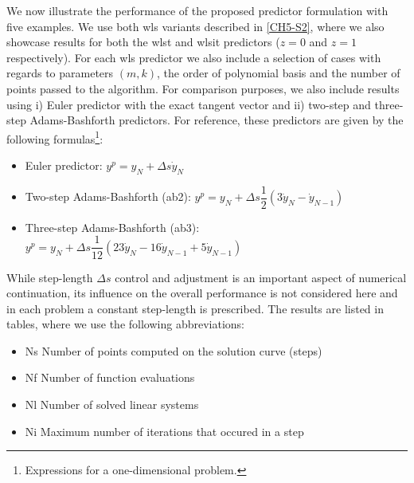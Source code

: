 We now illustrate the performance of the proposed predictor formulation with
five examples. We use both \acrshort{wls} variants described in \ref{CH5-S2}, 
where we also showcase results for both the \acrshort{wlst} and 
\acrshort{wlsit} predictors ($z=0$ and $z=1$ respectively). For each 
\acrshort{wls}
predictor we also include
a selection of cases with regards to parameters $(m,k)$, the order of 
polynomial basis and the number of points passed to the algorithm. For
comparison purposes, we also include results using i) Euler predictor with the
exact tangent vector and ii) two-step and three-step Adams-Bashforth
predictors\cite{Lundberg91}. For reference, these predictors are given by the
following formulas\footnote{Expressions for a one-dimensional problem.}:
\begin{itemize}[noitemsep]
	\item Euler predictor: $y^p = y_N+\Delta s\dot{y}_N$
	\item Two-step Adams-Bashforth (\acrshort{ab2}): $y^p=y_N+\Delta
	s\dfrac{1}{2}(3\dot{y}_N-\dot{y}_{N-1})$
	\item Three-step Adams-Bashforth (\acrshort{ab3}): $y^p=y_N+\Delta
	s\dfrac{1}{12}(23\dot{y}_N-16\dot{y}_{N-1}+5\dot{y}_{N-1})$ 
\end{itemize}
While
step-length $\Delta s$ control and adjustment is an important aspect of 
numerical continuation, its influence on the overall performance is not
considered here and in each problem a constant step-length is prescribed. The
results are listed in tables, where we use the following abbreviations:
\begin{itemize}[noitemsep]
	\item Ns \hspace{0.2cm}  Number of points computed on the solution curve 
	(steps)
	\item Nf  \hspace{0.23cm} Number of function evaluations
	\item Nl  \hspace{0.25cm} Number of solved linear systems
	\item Ni \hspace{0.25cm} Maximum number of iterations that occured in a step
\end{itemize}

